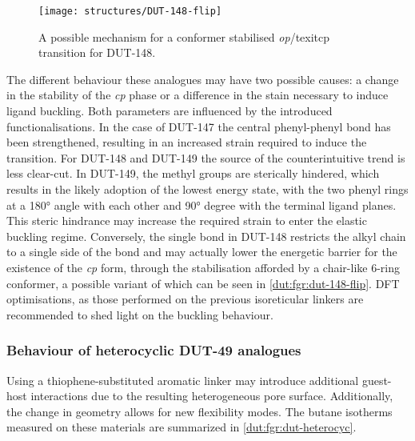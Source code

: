 \begin{figure}[htb]
    \centering
    \texttt{[image: structures/DUT-148-flip]}%
    \caption{A possible mechanism for a conformer stabilised 
    \textit{op}/texit{cp} transition for DUT-148.}%
    \label{dut:fgr:dut-148-flip}
\end{figure}

The different behaviour these analogues may have two possible
causes: a change in the stability of the \textit{cp} phase or a 
difference in the stain necessary to induce ligand buckling. Both
parameters are influenced by the introduced functionalisations. 
In the case of DUT-147 the central phenyl-phenyl bond
has been strengthened, resulting in an increased strain required to
induce the transition. For DUT-148 and DUT-149 the source of the 
counterintuitive trend is less clear-cut. In DUT-149, the methyl
groups are sterically hindered, which results in the likely
adoption of the lowest energy state, with the two phenyl rings
at a \ang{180} angle with each other and \ang{90} degree with the
terminal ligand planes. 
This steric hindrance may increase the required strain to 
enter the elastic buckling regime. Conversely, the 
single bond in DUT-148 restricts the alkyl chain to a single 
side of the bond and may actually lower the energetic barrier for
the existence of the \textit{cp} form, through the stabilisation
afforded by a chair-like 6-ring conformer, a possible variant 
of which can be seen in \autoref{dut:fgr:dut-148-flip}. 
DFT optimisations, as 
those performed on the previous isoreticular linkers are 
recommended to shed light on the buckling behaviour.

\subsubsection{Behaviour of heterocyclic DUT-49 analogues}

Using a thiophene-substituted aromatic linker may introduce additional
guest-host interactions due to the resulting heterogeneous pore
surface. Additionally, the change in geometry allows for new 
flexibility modes. The butane isotherms measured on these materials
are summarized in \autoref{dut:fgr:dut-heterocyc}.

